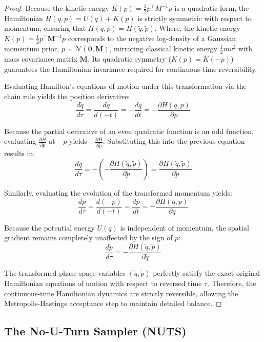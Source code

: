 \documentclass[12pt,oneside]{report}
\theoremstyle{definition}
\theoremstyle{remark}
\begin{document}
\begin{enumerate}
\begin{proof}
Because the kinetic energy $K(p) = \frac{1}{2} p^\top M^{-1} p$ is a quadratic form, the Hamiltonian $H(q, p) = U(q) + K(p)$ is strictly symmetric with respect to momentum, ensuring that $H(q, p) = H(\tilde{q}, \tilde{p})$. Where, the kinetic energy $K(p) = \frac{1}{2} p^\top \mathbf{M}^{-1} p$ corresponds to the negative log-density of a Gaussian momentum prior, $p \sim \mathcal{N}(\mathbf{0}, \mathbf{M})$, mirroring classical kinetic energy $\frac{1}{2}mv^2$ with mass covariance matrix $\mathbf{M}$. Its quadratic symmetry ($K(p) = K(-p)$) guarantees the Hamiltonian invariance required for continuous-time reversibility.

Evaluating Hamilton's equations of motion under this transformation via the chain rule yields the position derivative:
$$ \frac{d\tilde{q}}{d\tau} = \frac{dq}{d(-t)} = -\frac{dq}{dt} = -\frac{\partial H(q, p)}{\partial p} $$

Because the partial derivative of an even quadratic function is an odd function, evaluating $\frac{\partial H}{\partial p}$ at $-p$ yields $-\frac{\partial H}{\partial \tilde{p}}$. Substituting this into the previous equation results in:
$$ \frac{d\tilde{q}}{d\tau} = -\left( -\frac{\partial H(\tilde{q}, \tilde{p})}{\partial \tilde{p}} \right) = \frac{\partial H(\tilde{q}, \tilde{p})}{\partial \tilde{p}} $$

Similarly, evaluating the evolution of the transformed momentum yields:
$$ \frac{d\tilde{p}}{d\tau} = \frac{d(-p)}{d(-t)} = \frac{dp}{dt} = -\frac{\partial H(q, p)}{\partial q} $$

Because the potential energy $U(q)$ is independent of momentum, the spatial gradient remains completely unaffected by the sign of $p$:
$$ \frac{d\tilde{p}}{d\tau} = -\frac{\partial H(\tilde{q}, \tilde{p})}{\partial \tilde{q}} $$

The transformed phase-space variables $(\tilde{q}, \tilde{p})$ perfectly satisfy the exact original Hamiltonian equations of motion with respect to reversed time $\tau$. Therefore, the continuous-time Hamiltonian dynamics are strictly reversible, allowing the Metropolis-Hastings acceptance step to maintain detailed balance. 
\end{proof}

\end{enumerate}
\subsection{The No-U-Turn Sampler (NUTS)}
\label{subsec:nuts}
\end{document}
